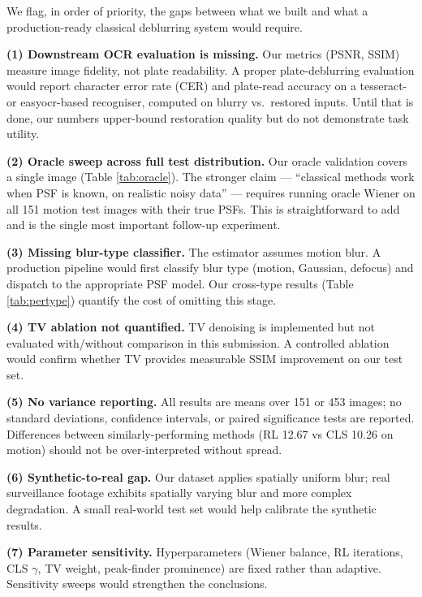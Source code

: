 \documentclass[12pt,a4paper]{article}
\begin{document}
We flag, in order of priority, the gaps between what we built and what a
production-ready classical deblurring system would require.

\textbf{(1) Downstream OCR evaluation is missing.} Our metrics (PSNR,
SSIM) measure image fidelity, not plate readability. A proper
plate-deblurring evaluation would report character error rate (CER) and
plate-read accuracy on a tesseract- or easyocr-based recogniser,
computed on blurry vs.\ restored inputs. Until that is done, our numbers
upper-bound restoration quality but do not demonstrate task utility.

\textbf{(2) Oracle sweep across full test distribution.} Our oracle
validation covers a single image (Table \ref{tab:oracle}). The stronger
claim --- ``classical methods work when PSF is known, on realistic
noisy data'' --- requires running oracle Wiener on all 151 motion test
images with their true PSFs. This is straightforward to add and is the
single most important follow-up experiment.

\textbf{(3) Missing blur-type classifier.} The estimator assumes motion
blur. A production pipeline would first classify blur type (motion,
Gaussian, defocus) and dispatch to the appropriate PSF model. Our
cross-type results (Table \ref{tab:pertype}) quantify the cost of
omitting this stage.

\textbf{(4) TV ablation not quantified.} TV denoising is implemented
but not evaluated with/without comparison in this submission. A
controlled ablation would confirm whether TV provides measurable
SSIM improvement on our test set.

\textbf{(5) No variance reporting.} All results are means over 151 or
453 images; no standard deviations, confidence intervals, or paired
significance tests are reported. Differences between
similarly-performing methods (RL 12.67 vs CLS 10.26 on motion) should
not be over-interpreted without spread.

\textbf{(6) Synthetic-to-real gap.} Our dataset applies spatially
uniform blur; real surveillance footage exhibits spatially varying blur
and more complex degradation. A small real-world test set would help
calibrate the synthetic results.

\textbf{(7) Parameter sensitivity.} Hyperparameters (Wiener balance, RL
iterations, CLS $\gamma$, TV weight, peak-finder prominence) are fixed
rather than adaptive. Sensitivity sweeps would strengthen the
conclusions.

\end{document}
